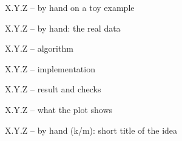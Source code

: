 \documentclass[aspectratio=169,11pt]{beamer}
\begin{document}
\begin{frame}{X.Y.Z -- by hand on a toy example}\small
\Byhand
\end{frame}

\begin{frame}{X.Y.Z -- by hand: the real data}
\Byhand
\end{frame}

\begin{frame}{X.Y.Z -- algorithm}
\Algo
\end{frame}

\begin{frame}[fragile]{X.Y.Z -- implementation}
\Impl
\end{frame}

\begin{frame}{X.Y.Z -- result and checks}
\Impl
\end{frame}

\begin{frame}{X.Y.Z -- what the plot shows}
\Impl
\end{frame}

\begin{frame}{X.Y.Z -- by hand (k/m): short title of the idea}\small
\Byhand
\end{frame}
\end{document}
